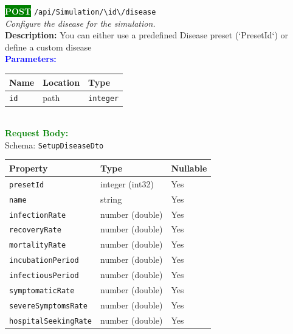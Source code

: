 \begin{tcolorbox}[
    colback=green!5,
    colframe=green,
    arc=2mm,
    boxrule=1pt,
    left=5pt,
    right=5pt,
    top=5pt,
    bottom=5pt
]
\noindent\colorbox{green}{\textcolor{white}{\textbf{POST}}} 
\texttt{\large /api/Simulation/\textbackslash{}{id\textbackslash{}}/disease}\\[0.3em]
\textit{Configure the disease for the simulation.}\\[0.3em]
\textbf{Description:} You can either use a predefined Disease preset (`PresetId`) or define a custom disease\\[0.5em]
\vspace{0.3em}
\textbf{\textcolor{blue}{Parameters:}}\\[0.2em]
\begin{tabular}{|l|l|l|}
\hline
\rowcolor{gray!20}
\textbf{Name} & \textbf{Location} & \textbf{Type} \\ \hline
\texttt{id} & path & \texttt{integer} \\ \hline
\end{tabular}\\[0.5em]
\vspace{0.3em}
\textbf{\textcolor{green}{Request Body:}}\\[0.2em]
Schema: \texttt{SetupDiseaseDto}\\[0.3em]
\begin{tabular}{|l|l|l|}
\hline
\rowcolor{green!10}
\textbf{Property} & \textbf{Type} & \textbf{Nullable} \\ \hline
\texttt{presetId} & integer (int32) & Yes \\ \hline
\rowcolor{gray!5}
\texttt{name} & string & Yes \\ \hline
\texttt{infectionRate} & number (double) & Yes \\ \hline
\rowcolor{gray!5}
\texttt{recoveryRate} & number (double) & Yes \\ \hline
\texttt{mortalityRate} & number (double) & Yes \\ \hline
\rowcolor{gray!5}
\texttt{incubationPeriod} & number (double) & Yes \\ \hline
\texttt{infectiousPeriod} & number (double) & Yes \\ \hline
\rowcolor{gray!5}
\texttt{symptomaticRate} & number (double) & Yes \\ \hline
\texttt{severeSymptomsRate} & number (double) & Yes \\ \hline
\rowcolor{gray!5}
\texttt{hospitalSeekingRate} & number (double) & Yes \\ \hline

\end{tabular}
\end{tcolorbox}
